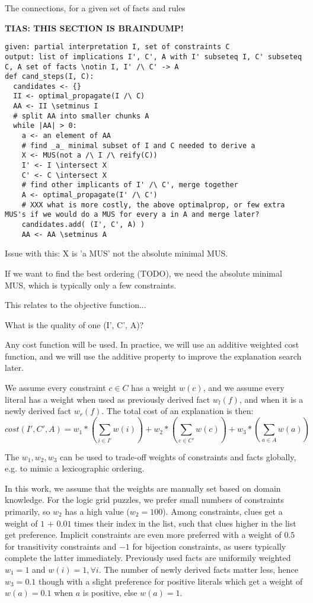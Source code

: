 The connections, for a given set of facts and rules

\textbf{TIAS: THIS SECTION IS BRAINDUMP!}

\begin{verbatim}
given: partial interpretation I, set of constraints C
output: list of implications I', C', A with I' subseteq I, C' subseteq C, A set of facts \notin I, I' /\ C' -> A
def cand_steps(I, C):
  candidates <- {}
  II <- optimal_propagate(I /\ C)
  AA <- II \setminus I
  # split AA into smaller chunks A
  while |AA| > 0:
  	a <- an element of AA
  	# find _a_ minimal subset of I and C needed to derive a
  	X <- MUS(not a /\ I /\ reify(C))
  	I' <- I \intersect X
  	C' <- C \intersect X
  	# find other implicants of I' /\ C', merge together
  	A <- optimal_propagate(I' /\ C')
  	# XXX what is more costly, the above optimalprop, or few extra MUS's if we would do a MUS for every a in A and merge later?
  	candidates.add( (I', C', A) )
  	AA <- AA \setminus A
\end{verbatim}

Issue with this: X is 'a MUS' not the absolute minimal MUS.

If we want to find the best ordering (TODO), we need the absolute minimal MUS, which is typically only a few constraints.

This relates to the objective function...

What is the quality of one (I', C', A)?

Any cost function will be used. In practice, we will use an additive weighted cost function, and we will use the additive property to improve the explanation search later.

We assume every constraint $c \in C$ has a weight $w(c)$, and we assume every literal has a weight when used as previously derived fact $w_l(f)$, and when it is a newly derived fact $w_r(f)$. The total cost of an explanation is then:
$$ cost(I', C', A) = w_1*(\sum_{i \in I'} w(i)) + w_2*(\sum_{c \in C'} w(c)) + w_3*(\sum_{a \in A} w(a))$$

The $w_1, w_2, w_3$ can be used to trade-off weights of constraints and facts globally, e.g. to mimic a lexicographic ordering.

In this work, we assume that the weights are manually set based on domain knowledge. For the logic grid puzzles, we prefer small numbers of constraints primarily, so $w_2$ has a high value ($w_2=100$). Among constraints, clues get a weight of $1$ + $0.01$ times their index in the list, such that clues higher in the list get preference. Implicit constraints are even more preferred with a weight of $0.5$ for transitivity constraints and $-1$ for bijection constraints, as users typically complete the latter immediately.
Previously used facts are uniformily weighted $w_1=1$ and $w(i)=1, \forall i$. The number of newly derived facts matter less, hence $w_3=0.1$ though with a slight preference for positive literals which get a weight of $w(a)=0.1$ when $a$ is positive, else $w(a)=1$.

